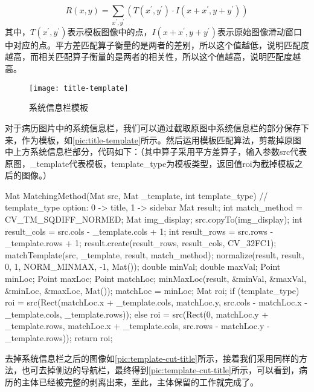 \begin{equation} \label{eq:correlation}
R(x,y)=\sum_{x^{'},y^{'}}(T(x^{'},y^{'})\cdot I(x+x^{'},y+y^{'}))
\end{equation}
其中，$T(x^{'},y^{'})$表示模板图像中的点，$I(x+x^{'},y+y^{'})$表示原始图像滑动窗口中对应的点。平方差匹配算子衡量的是两者的差别，所以这个值越低，说明匹配度越高，而相关匹配算子衡量的是两者的相关性，所以这个值越高，说明匹配度越高。

\begin{figure}
	\centering
	\texttt{[image: title-template]}
	\caption{系统信息栏模板}
	\label{pic:title-template}
\end{figure}

对于病历图片中的系统信息栏，我们可以通过截取原图中系统信息栏的部分保存下来，作为模板，如\autoref{pic:title-template}所示。然后运用模板匹配算法，剪裁掉原图中上方系统信息栏部分，代码如下：（其中算子采用平方差算子，输入参数src代表原图，\_template代表模板，template\_type为模板类型，返回值roi为截掉模板之后的图像。）
\begin{Codex}[label=Cut,numbers=left]
Mat MatchingMethod(Mat src, Mat _template, int template_type)
{
	// template_type option:  0 -> title, 1 -> sidebar
	Mat result;
	int match_method = CV_TM_SQDIFF_NORMED;
	Mat img_display;
	src.copyTo(img_display);
	int result_cols = src.cols - _template.cols + 1;
	int result_rows = src.rows - _template.rows + 1;
	result.create(result_rows, result_cols, CV_32FC1);
	matchTemplate(src, _template, result, match_method);
	normalize(result, result, 0, 1, NORM_MINMAX, -1, Mat());
	double minVal; double maxVal; Point minLoc; Point maxLoc;
	Point matchLoc;
	minMaxLoc(result, &minVal, &maxVal, &minLoc, &maxLoc, Mat());
	matchLoc = minLoc;
	Mat roi;
	if (template_type)
	roi = src(Rect(matchLoc.x + _template.cols, matchLoc.y, src.cols - matchLoc.x - _template.cols, _template.rows));
	else
	roi = src(Rect(0, matchLoc.y + _template.rows, matchLoc.x + _template.cols, src.rows - matchLoc.y - _template.rows));
	return roi;
}
\end{Codex}

去掉系统信息栏之后的图像如\autoref{pic:template-cut-title}所示，接着我们采用同样的方法，也可去掉侧边的导航栏，最终得到\autoref{pic:template-cut-title}所示，可以看到，病历的主体已经被完整的剥离出来，至此，主体保留的工作就完成了。

